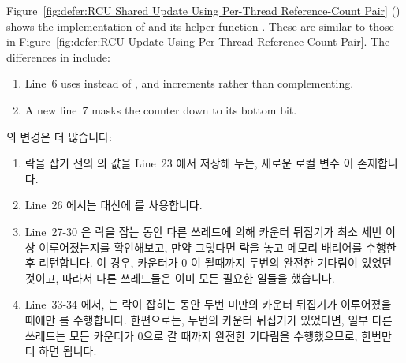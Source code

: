 Figure~\ref{fig:defer:RCU Shared Update Using Per-Thread Reference-Count Pair}
()
shows the implementation of  and its helper
function .
These are similar to those in
Figure~\ref{fig:defer:RCU Update Using Per-Thread Reference-Count Pair}.
The differences in  include:
\begin{enumerate}
\item	Line~6 uses  instead of ,
	and increments rather than complementing.
\item	A new line~7 masks the counter down to its bottom bit.
\end{enumerate}
\fi

 의 변경은 더 많습니다:
\begin{enumerate}
\item	락을 잡기 전의  의 값을 Line~23 에서 저장해 두는, 새로운
	로컬 변수  이 존재합니다.
\item	Line~26 에서는  대신에  를
	사용합니다.
\item	Line~27-30 은 락을 잡는 동안 다른 쓰레드에 의해 카운터 뒤집기가 최소
	세번 이상 이루어졌는지를 확인해보고, 만약 그렇다면 락을 놓고 메모리
	배리어를 수행한 후 리턴합니다.
	이 경우, 카운터가 0 이 될때까지 두번의 완전한 기다림이 있었던 것이고,
	따라서 다른 쓰레드들은 이미 모든 필요한 일들을 했습니다.
\item	Line~33-34 에서,  는 락이 잡히는 동안 두번
	미만의 카운터 뒤집기가 이루어졌을 때에만 
	를 수행합니다.
	한편으로는, 두번의 카운터 뒤집기가 있었다면, 일부 다른 쓰레드는 모든
	카운터가 0으로 갈 때까지 완전한 기다림을 수행했으므로, 한번만 더 하면
	됩니다.
\end{enumerate}
\iffalse

The changes to \co{synchronize_rcu()} are more pervasive:
\begin{enumerate}
\item	There is a new \co{oldctr} local variable that captures
	the pre-lock-acquisition value of \co{rcu_idx} on
	line~23.
\item	Line~26 uses \co{ACCESS_ONCE()} instead of \co{atomic_read()}.
\item	Lines~27-30 check to see if at least three counter flips were
	performed by other threads while the lock was being acquired,
	and, if so, releases the lock, does a memory barrier, and returns.
	In this case, there were two full waits for the counters to
	go to zero, so those other threads already did all the required work.
\item	At lines~33-34, \co{flip_counter_and_wait()} is only
	invoked a second time if there were fewer than two counter flips
	while the lock was being acquired.
	On the other hand, if there were two counter flips, some other
	thread did one full wait for all the counters to go to zero,
	so only one more is required.
\end{enumerate}
\fi

